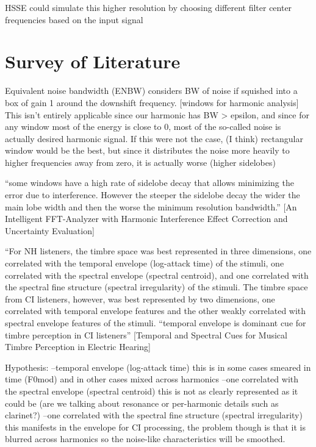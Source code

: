 \documentclass [11pt, proquest,oneside] {ganter_thesis}[2015/03/03]
\begin{document}
HSSE could simulate this higher resolution by choosing different filter center frequencies based on the input signal

\section{Survey of Literature}

Equivalent noise bandwidth (ENBW) considers BW of noise if squished into a box of gain 1 around the downshift frequency.  [windows for harmonic analysis] This isn't entirely applicable since our harmonic has BW > epsilon, and since for any window most of the energy is close to 0, most of the so-called noise is actually desired harmonic signal.  If this were not the case, (I think) rectangular window would be the best, but since it distributes the noise more heavily to higher frequencies away from zero, it is actually worse (higher sidelobes)

``some windows have a high rate of sidelobe decay that allows minimizing the error due to interference. However the steeper the sidelobe decay
the wider the main lobe width and then the worse the minimum resolution bandwidth.'' [An Intelligent FFT-Analyzer with Harmonic Interference Effect Correction and Uncertainty Evaluation]

``For NH listeners, the timbre space was best represented in three dimensions, one correlated with the temporal envelope (log-attack time) of the stimuli, one correlated with the spectral envelope (spectral centroid), and one correlated with the spectral fine structure (spectral irregularity) of the stimuli. The timbre space from CI listeners, however, was best represented by two dimensions, one correlated with temporal envelope features and the other weakly correlated with spectral envelope features of the stimuli. 
``temporal envelope is dominant cue for timbre perception in CI listeners''
[Temporal and Spectral Cues for Musical Timbre
Perception in Electric Hearing]

Hypothesis:
--temporal envelope (log-attack time)
this is in some cases smeared in time (F0mod) and in other cases mixed across harmonics
--one correlated with the spectral envelope (spectral centroid)
this is not as clearly represented as it could be (are we talking about resonance or per-harmonic details such as clarinet?)
--one correlated with the spectral fine structure (spectral irregularity)
this manifests in the envelope for CI processing, the problem though is that it is blurred across harmonics so the noise-like characteristics will be smoothed.
\end{document}
